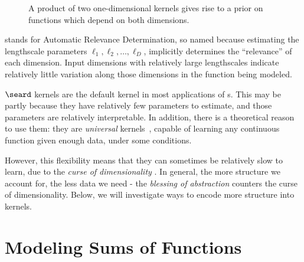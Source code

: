 \begin{figure}[ht!]
\begin{tabular}{ccccccc}
\end{tabular}
\caption[A product of squared-exponential kernels across different dimensions]{
A product of two one-dimensional kernels gives rise to a prior on functions which depend on both dimensions.
}
\label{fig:product-of-se-kernels}
\end{figure}

\ARD{} stands for Automatic Relevance Determination, so named because estimating the lengthscale parameters $\ell_1, \ell_2, \dots, \ell_D$, implicitly determines the ``relevance'' of each dimension.
Input dimensions with relatively large lengthscales indicate relatively little variation along those dimensions in the function being modeled.

$\seard$ kernels are the default kernel in most applications of \gp{}s.
This may be partly because they have relatively few parameters to estimate, and those parameters are relatively interpretable.
In addition, there is a theoretical reason to use them: they are \emph{universal} kernels~\citep{micchelli2006universal}, capable of learning any continuous function given enough data, under some conditions.

However, this flexibility means that they can sometimes be relatively slow to learn, due to the \emph{curse of dimensionality} \citep{bellman1956dynamic}.
In general, the more structure we account for, the less data we need - the \emph{blessing of abstraction} \citep{goodman2011learning} counters the curse of dimensionality.
Below, we will investigate ways to encode more structure into kernels.



\section{Modeling Sums of Functions}


